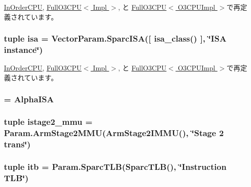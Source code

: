 \hyperlink{classInOrderCPU_aa0d8dc5e214b94342d1f730e4e34ae82}{InOrderCPU}, \hyperlink{classFullO3CPU_aa0d8dc5e214b94342d1f730e4e34ae82}{FullO3CPU$<$ Impl $>$}, と \hyperlink{classFullO3CPU_aa0d8dc5e214b94342d1f730e4e34ae82}{FullO3CPU$<$ O3CPUImpl $>$}で再定義されています。\hypertarget{classBaseCPU_a6d1804c8bb7cb5ff7f700541100052c4}{
\subsubsection[{isa}]{\setlength{\rightskip}{0pt plus 5cm}tuple {\bf isa} = VectorParam.SparcISA(\mbox{[} {\bf isa\_\-class}() \mbox{]}, \char`\"{}ISA instance\char`\"{})}}
\label{classBaseCPU_a6d1804c8bb7cb5ff7f700541100052c4}


\hyperlink{classInOrderCPU_aa0d8dc5e214b94342d1f730e4e34ae82}{InOrderCPU}, \hyperlink{classFullO3CPU_aa0d8dc5e214b94342d1f730e4e34ae82}{FullO3CPU$<$ Impl $>$}, と \hyperlink{classFullO3CPU_aa0d8dc5e214b94342d1f730e4e34ae82}{FullO3CPU$<$ O3CPUImpl $>$}で再定義されています。\hypertarget{classBaseCPU_a7834205597f6fdfa3801594ba899afcb}{
\subsubsection[{isa\_\-class}]{ = AlphaISA}}
\label{classBaseCPU_a7834205597f6fdfa3801594ba899afcb}
\hypertarget{classBaseCPU_a3efa5b96277fd1a9947fc495f93d81aa}{
\subsubsection[{istage2\_\-mmu}]{\setlength{\rightskip}{0pt plus 5cm}tuple {\bf istage2\_\-mmu} = Param.ArmStage2MMU(ArmStage2IMMU(), \char`\"{}Stage 2 trans\char`\"{})}}
\label{classBaseCPU_a3efa5b96277fd1a9947fc495f93d81aa}
\hypertarget{classBaseCPU_a05093b507c1f741f2150103b12ac7056}{
\subsubsection[{itb}]{\setlength{\rightskip}{0pt plus 5cm}tuple {\bf itb} = Param.SparcTLB(SparcTLB(), \char`\"{}Instruction TLB\char`\"{})}}
\label{classBaseCPU_a05093b507c1f741f2150103b12ac7056}


